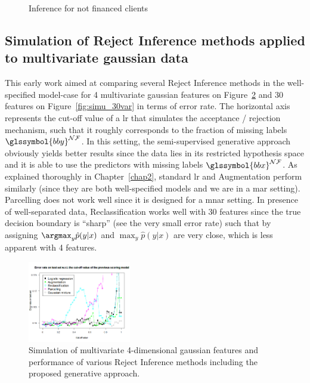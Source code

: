 \begin{table}
{\begin{multicols}{3}
\begin{subfigure}[t]{0.31\textwidth}
\caption{Inference for not financed clients}
\label{parcel:sfig3}
\end{subfigure}

\end{multicols}
}
\end{table}



\subsection{Simulation of Reject Inference methods applied to multivariate gaussian data} \label{subsec:app_reject_sim}

This early work aimed at comparing several Reject Inference methods in the well-specified model-case for 4 multivariate gaussian features on Figure~\ref{fig:simu_4var} and 30 features on Figure~\ref{fig:simu_30var} in terms of error rate. The horizontal axis represents the cut-off value of a \gls{lr} that simulates the acceptance / rejection mechanism, such that it roughly corresponds to the fraction of missing labels $\glssymbol{bby}^{\mathcal{N}\mathcal{F}}$. In this setting, the semi-supervised generative approach obviously yields better results since the data lies in its restricted hypothesis space and it is able to use the predictors with missing labels $\glssymbol{bbx}^{\mathcal{N}\mathcal{F}}$. As explained thoroughly in Chapter~\ref{chap2}, standard \gls{lr} and Augmentation perform similarly (since they are both well-specified models and we are in a \gls{mar} setting). Parcelling does not work well since it is designed for a \gls{mnar} setting. In presence of well-separated data, Reclassification works well with 30 features since the true decision boundary is ``sharp'' (see the very small error rate) such that by assigning $\argmax_y \hat{p}(y | x)$ and $\max_y \hat{p}(y | x)$ are very close, which is less apparent with 4 features.


\begin{figure}[H]
\centering
\includegraphics[width=0.4\textwidth]{figures/appendix/rejectinferencesimulation4var.png}
\caption{Simulation of multivariate 4-dimensional gaussian features and performance of various Reject Inference methods including the proposed generative approach.}
\label{fig:simu_4var}
\end{figure}

